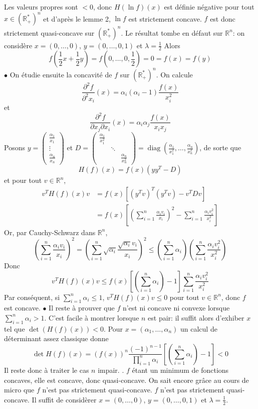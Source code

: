 \documentclass{report}
\DeclareMathOperator{\diag}{diag}
\begin{document}
Les valeurs propres sont $<0$, donc $H(\ln f)(x)$ est définie négative pour tout $x\in(\mathbb R_+^*)^n $ et d'après le lemme 2, $\ln f$ est strictement concave. $f$ est donc strictement quasi-concave sur $(\mathbb R_+^*)^n$.\newline
Le résultat tombe en défaut sur $\mathbb R^n$: on considère $x=(0,\ldots,0)$, $y=(0,\ldots,0,1)$ et $\lambda=\frac{1}{2}$ Alors $$f(\frac{1}{2}x + \frac{1}{2}y) = f(0,\ldots, 0,\frac{1}{2})=0 = f(x) = f(y)$$
$\bullet$ On étudie ensuite la concavité de $f$ sur $(\mathbb R_+^*)^n$.\newline
On calcule $$\frac{\partial^2 f}{\partial^2 x_i}(x) = \alpha_i(\alpha_i-1)\frac{f(x)}{x_i^2}$$
et $$\frac{\partial^2 f}{\partial x_j \partial x_i}(x) = \alpha_i \alpha_j\frac{f(x)}{x_i x_j}$$
Posons $y=\begin{pmatrix}
\frac{\alpha_1}{x_1}\\
\vdots\\
\frac{\alpha_n}{x_n}
\end{pmatrix}$ et $D=\begin{pmatrix}
\frac{\alpha_1}{x_1^2}\\
& \ddots \\
&& \frac{\alpha_n}{x_n^2}
\end{pmatrix}=\diag(\frac{\alpha_1}{x_1^2},\ldots,\frac{\alpha_n}{x_n^2})$, de sorte que 
$$H(f)(x)=f(x)(yy^T-D)$$ et pour tout $v\in \mathbb R^n$,
$$\begin{aligned} v^TH(f)(x)v &= f(x)[(y^Tv)^T(y^Tv)-v^TDv] \\
&= f(x) \left[\left(\sum_{i=1}^n \frac{\alpha_i v_i}{x_i}\right)^2 - \sum_{i=1}^n \frac{\alpha_i v_i^2}{x_i^2} \right]
\end{aligned}$$
Or, par Cauchy-Schwarz dans $\mathbb R^n$, 
$$\left(\sum_{i=1}^n\frac{\alpha_i v_i}{x_i} \right)^2 = \left(\sum_{i=1}^n \sqrt{\alpha_i}\frac{\sqrt{\alpha_i} v_i}{x_i} \right)^2 \leq \left(\sum_{i=1}^n \alpha_i \right) \left(\sum_{i=1}^n\frac{\alpha_i v_i^2}{x_i^2} \right)$$
Donc $$ v^TH(f)(x)v \leq f(x)\left[ \left(\sum_{i=1}^n \alpha_i\right) -1 \right]\sum_{i=1}^n\frac{\alpha_i v_i^2}{x_i^2}$$
Par conséquent, si $\displaystyle \sum_{i=1}^n \alpha_i \leq 1$, $v^TH(f)(x)v \leq 0$ pour tout $v\in \mathbb R^n$, donc $f$ est concave. \newline 
\newline
$\bullet$ Il reste à prouver que $f$ n'est ni concave ni convexe lorsque $\displaystyle \sum_{i=1}^n \alpha_i > 1$. C'est facile à montrer lorsque $n$ est pair: il suffit alors d'exhiber $x$ tel que $\det(H(f)(x))<0$. \newline
Pour $x=(\alpha_1,\ldots, \alpha_n)$ un calcul de déterminant assez classique donne $$\det H(f)(x)=(f(x))^n\frac{(-1)^{n-1}}{\prod_{i=1}^{n}\alpha_i} \left[\left(\sum_{i=1}^n \alpha_i \right) -1 \right]<0$$
Il reste donc à traiter le cas $n$ impair.
\newline {}. $f$ étant un minimum de fonctions concaves, elle est concave, donc quasi-concave. On sait encore grâce au cours de micro que $f$ n'est pas strictement quasi-concave. \newline
$f$ n'est pas strictement quasi-concave. Il suffit de considèrer $x=(0,\ldots,0)$, $y=(0,\ldots,0,1)$ et $\lambda=\frac{1}{2}$.
\end{document}
